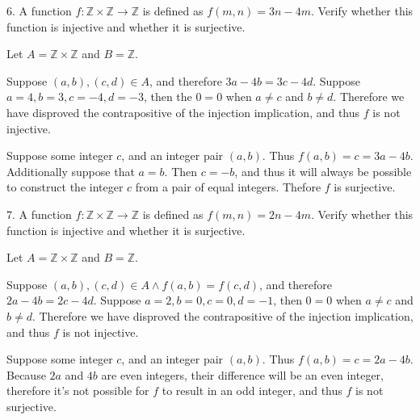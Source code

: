 \documentclass{article}
\begin{document}
\begin{exercise}{}{}{6. A function $f: \mathbb{Z} \times \mathbb{Z} \rightarrow
			\mathbb{Z}$ is defined as $f(m, n)=3 n-4 m$. Verify whether this function is
		injective and whether it is surjective.}
	\begin{alist}
		\item Let $A=\mathbb{Z}\times\mathbb{Z}$ and $B=\mathbb{Z}$.
		\item Suppose $(a, b), (c, d) \in A$, and therefore
		$3a-4b=3c-4d$. Suppose $a=4, b=3, c=-4, d=-3$, then the $0=0$ when $a\neq c$
		and $b\neq d$. Therefore we have disproved the contrapositive of the
		injection implication, and thus $f$ is not injective.
		\item Suppose some integer $c$, and an integer pair $(a, b)$. Thus $f(a,
			b)=c=3a-4b$. Additionally suppose that $a=b$. Then $c = -b$, and thus it will
		always be possible to construct the integer $c$ from a pair of equal
		integers. Thefore $f$ is surjective.
	\end{alist}
\end{exercise}{}{}

\begin{exercise}{}{}
	{7. A function $f: \mathbb{Z} \times \mathbb{Z} \rightarrow
			\mathbb{Z}$ is defined as $f(m, n)=2 n-4 m$. Verify whether this function is
		injective and whether it is surjective.}
	\begin{alist}
		\item Let $A=\mathbb{Z}\times\mathbb{Z}$ and $B=\mathbb{Z}$.
		\item Suppose $(a, b), (c, d) \in A \land f(a, b)=f(c, d)$, and therefore
		$2a-4b=2c-4d$. Suppose $a=2, b=0, c=0, d=-1$, then $0=0$ when $a\neq c$
		and $b\neq d$. Therefore we have disproved the contrapositive of the
		injection implication, and thus $f$ is not injective.
		\item Suppose some integer $c$, and an integer pair $(a, b)$. Thus $f(a,
			b)=c=2a-4b$. Because $2a$ and $4b$ are even integers, their difference will
		be an even integer, therefore it's not possible for $f$ to result in an odd
		integer, and thus $f$ is not surjective.
	\end{alist}
\end{exercise}{}{}
\end{document}
